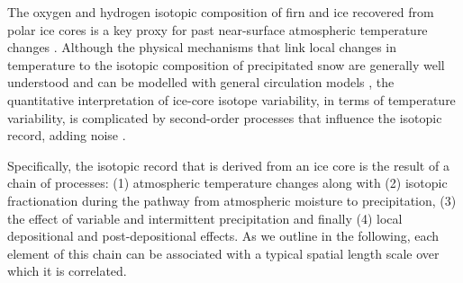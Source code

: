 \documentclass[cp]{copernicus}
\begin{document}
\introduction

The oxygen and hydrogen isotopic composition of firn and ice recovered from
polar ice cores is a key proxy for past near-surface atmospheric temperature
changes \citep{Dansgaard1964,Lorius1969,Masson-Delmotte2008,Sjolte2011}.
Although the physical mechanisms that link local changes in temperature to the
isotopic composition of precipitated snow are generally well understood
\citep{Dansgaard1964,Craig1965,Jouzel1984} and can be modelled with general
circulation models
\citep{Joussaume1984,Werner2011,Werner2016,Sjolte2011,Goursaud2018}, the
quantitative interpretation of ice-core isotope variability, in terms of
temperature variability, is complicated by second-order processes that influence
the isotopic record, adding noise \citep{Munch2018a}.

Specifically, the isotopic record that is derived from an ice core is the result
of a chain of processes: (1) atmospheric temperature changes along with (2)
isotopic fractionation during the pathway from atmospheric moisture to
precipitation, (3) the effect of variable and intermittent precipitation and
finally (4) local depositional and post-depositional effects. As we outline in
the following, each element of this chain can be associated with a typical
spatial length scale over which it is correlated.
\end{document}
